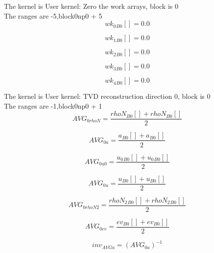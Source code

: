 \documentclass{article}
\begin{document}
\noindent The kernel is User kernel: Zero the work arrays, block is 0\\\noindent The ranges are -5,block0np0 + 5\\\begin{dmath}{wk_{0}{_{B0}}}[{}] = 0.0\end{dmath}

\begin{dmath}{wk_{1}{_{B0}}}[{}] = 0.0\end{dmath}

\begin{dmath}{wk_{2}{_{B0}}}[{}] = 0.0\end{dmath}

\begin{dmath}{wk_{3}{_{B0}}}[{}] = 0.0\end{dmath}

\begin{dmath}{wk_{4}{_{B0}}}[{}] = 0.0\end{dmath}

\noindent The kernel is User kernel: TVD reconstruction direction 0, block is 0\\\noindent The ranges are -1,block0np0 + 1\\\begin{dmath}AVG_{0 rhoN} = \frac{{rhoN{_{B0}}}[{}] + {rhoN{_{B0}}}[{}]}{2}\end{dmath}

\begin{dmath}AVG_{0 a} = \frac{{a{_{B0}}}[{}] + {a{_{B0}}}[{}]}{2}\end{dmath}

\begin{dmath}AVG_{0 u0} = \frac{{u_{0}{_{B0}}}[{}] + {u_{0}{_{B0}}}[{}]}{2}\end{dmath}

\begin{dmath}AVG_{0 u} = \frac{{u{_{B0}}}[{}] + {u{_{B0}}}[{}]}{2}\end{dmath}

\begin{dmath}AVG_{0 rhoN2} = \frac{{rhoN_{2}{_{B0}}}[{}] + {rhoN_{2}{_{B0}}}[{}]}{2}\end{dmath}

\begin{dmath}AVG_{0 ev} = \frac{{ev{_{B0}}}[{}] + {ev{_{B0}}}[{}]}{2}\end{dmath}

\begin{dmath}inv_{AVG a} = \left(AVG_{0 a} \right)^{-1}\end{dmath}
\end{document}
